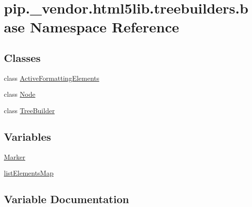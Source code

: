 \hypertarget{namespacepip_1_1__vendor_1_1html5lib_1_1treebuilders_1_1base}{}\section{pip.\+\_\+vendor.\+html5lib.\+treebuilders.\+base Namespace Reference}
\label{namespacepip_1_1__vendor_1_1html5lib_1_1treebuilders_1_1base}
\subsection*{Classes}
\begin{DoxyCompactItemize}
\item 
class \hyperlink{classpip_1_1__vendor_1_1html5lib_1_1treebuilders_1_1base_1_1ActiveFormattingElements}{Active\+Formatting\+Elements}
\item 
class \hyperlink{classpip_1_1__vendor_1_1html5lib_1_1treebuilders_1_1base_1_1Node}{Node}
\item 
class \hyperlink{classpip_1_1__vendor_1_1html5lib_1_1treebuilders_1_1base_1_1TreeBuilder}{Tree\+Builder}
\end{DoxyCompactItemize}
\subsection*{Variables}
\begin{DoxyCompactItemize}
\item 
\hyperlink{namespacepip_1_1__vendor_1_1html5lib_1_1treebuilders_1_1base_a25c989f789525addb2d9bf27a3500843}{Marker}
\item 
\hyperlink{namespacepip_1_1__vendor_1_1html5lib_1_1treebuilders_1_1base_acb4ae6cbf011887a551efd004a3931b6}{list\+Elements\+Map}
\end{DoxyCompactItemize}


\subsection{Variable Documentation}
\mbox{\label{namespacepip_1_1__vendor_1_1html5lib_1_1treebuilders_1_1base_acb4ae6cbf011887a551efd004a3931b6}} 
